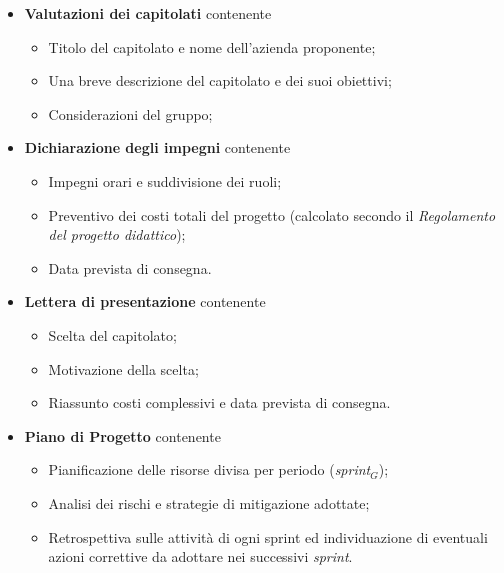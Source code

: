 \documentclass[10pt, letterpaper]{article}
\begin{document}
\begin{itemize}
    \item \textbf{Valutazioni dei capitolati} contenente
          \begin{itemize}
              \item Titolo del capitolato e nome dell'azienda proponente;
              \item Una breve descrizione del capitolato e dei suoi obiettivi;
              \item Considerazioni del gruppo;
          \end{itemize}

    \item \textbf{Dichiarazione degli impegni} contenente
          \begin{itemize}
              \item Impegni orari e suddivisione dei ruoli;
              \item Preventivo dei costi totali del progetto (calcolato secondo il \textit{Regolamento del progetto didattico});
              \item Data prevista di consegna.
          \end{itemize}

    \item \textbf{Lettera di presentazione} contenente
          \begin{itemize}
              \item Scelta del capitolato;
              \item Motivazione della scelta;
              \item Riassunto costi complessivi e data prevista di consegna.
          \end{itemize}

    \item \textbf{Piano di Progetto} contenente
          \begin{itemize}
              \item Pianificazione delle risorse divisa per periodo (\textit{sprint$_{G}$});
              \item Analisi dei rischi e strategie di mitigazione adottate;
              \item Retrospettiva sulle attività di ogni sprint ed individuazione di eventuali azioni correttive da adottare nei successivi \textit{sprint}.
          \end{itemize}


\end{itemize}
\end{document}
